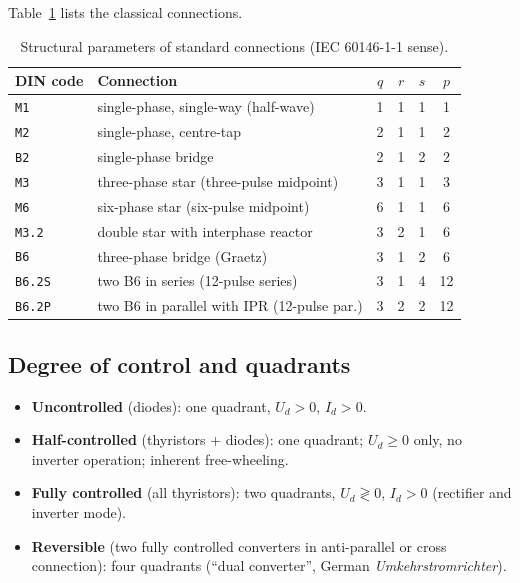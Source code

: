 \documentclass[11pt,a4paper]{article}
\newcommand{\code}[1]{\texttt{#1}}
\begin{document}
Table~\ref{tab:pqrs} lists the classical connections.

\begin{table}[htb]
\centering
\caption{Structural parameters of standard connections (IEC 60146-1-1 sense).}
\label{tab:pqrs}
\begin{tabular}{llcccc}
\toprule
DIN code & Connection & $q$ & $r$ & $s$ & $p$ \\
\midrule
\code{M1}  & single-phase, single-way (half-wave)          & 1 & 1 & 1 & 1 \\
\code{M2}  & single-phase, centre-tap                     & 2 & 1 & 1 & 2 \\
\code{B2}  & single-phase bridge                          & 2 & 1 & 2 & 2 \\
\code{M3}  & three-phase star (three-pulse midpoint)      & 3 & 1 & 1 & 3 \\
\code{M6}  & six-phase star (six-pulse midpoint)          & 6 & 1 & 1 & 6 \\
\code{M3.2}& double star with interphase reactor          & 3 & 2 & 1 & 6 \\
\code{B6}  & three-phase bridge (Graetz)                  & 3 & 1 & 2 & 6 \\
\code{B6.2S} & two B6 in series (12-pulse series)         & 3 & 1 & 4 & 12 \\
\code{B6.2P} & two B6 in parallel with IPR (12-pulse par.)& 3 & 2 & 2 & 12 \\
\bottomrule
\end{tabular}
\end{table}

\subsection{Degree of control and quadrants}

\begin{itemize}
\item \textbf{Uncontrolled} (diodes): one quadrant, $U_d>0$, $I_d>0$.
\item \textbf{Half-controlled} (thyristors + diodes): one quadrant; $U_d \ge 0$ only, no inverter operation; inherent free-wheeling.
\item \textbf{Fully controlled} (all thyristors): two quadrants, $U_d \gtrless 0$, $I_d>0$ (rectifier and inverter mode).
\item \textbf{Reversible} (two fully controlled converters in anti-parallel or cross connection): four quadrants (``dual converter'', German \emph{Umkehrstromrichter}).
\end{itemize}
\end{document}
